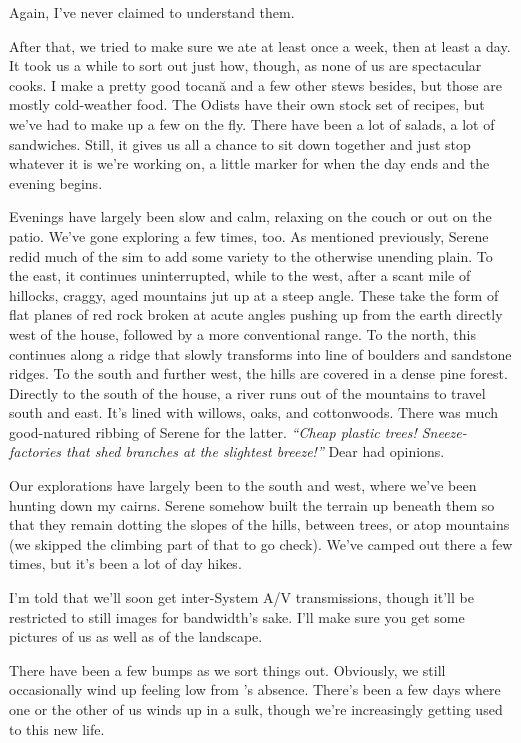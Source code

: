 Again, I've never claimed to understand them.

After that, we tried to make sure we ate at least once a week, then at least a day. It took us a while to sort out just how, though, as none of us are spectacular cooks. I make a pretty good tocană and a few other stews besides, but those are mostly cold-weather food. The Odists have their own stock set of recipes, but we've had to make up a few on the fly. There have been a lot of salads, a lot of sandwiches. Still, it gives us all a chance to sit down together and just stop whatever it is we're working on, a little marker for when the day ends and the evening begins.

Evenings have largely been slow and calm, relaxing on the couch or out on the patio. We've gone exploring a few times, too. As mentioned previously, Serene redid much of the sim to add some variety to the otherwise unending plain. To the east, it continues uninterrupted, while to the west, after a scant mile of hillocks, craggy, aged mountains jut up at a steep angle. These take the form of flat planes of red rock broken at acute angles pushing up from the earth directly west of the house, followed by a more conventional range. To the north, this continues along a ridge that slowly transforms into line of boulders and sandstone ridges. To the south and further west, the hills are covered in a dense pine forest. Directly to the south of the house, a river runs out of the mountains to travel south and east. It's lined with willows, oaks, and cottonwoods. There was much good-natured ribbing of Serene for the latter. \emph{``Cheap plastic trees! Sneeze-factories that shed branches at the slightest breeze!''} Dear had opinions.

Our explorations have largely been to the south and west, where we've been hunting down my cairns. Serene somehow built the terrain up beneath them so that they remain dotting the slopes of the hills, between trees, or atop mountains (we skipped the climbing part of that to go check). We've camped out there a few times, but it's been a lot of day hikes.

I'm told that we'll soon get inter-System A/V transmissions, though it'll be restricted to still images for bandwidth's sake. I'll make sure you get some pictures of us as well as of the landscape.

There have been a few bumps as we sort things out. Obviously, we still occasionally wind up feeling low from \Partner 's absence. There's been a few days where one or the other of us winds up in a sulk, though we're increasingly getting used to this new life.

